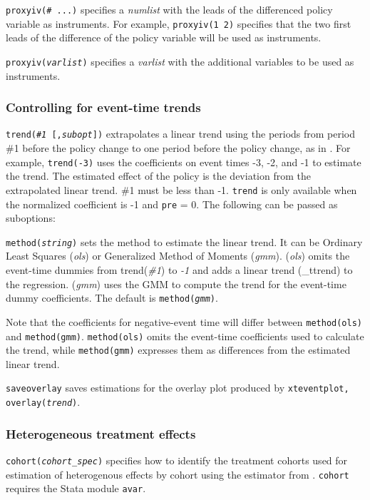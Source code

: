 \documentclass[12pt]{article}
\begin{document}
\morehangpara
{\tt proxyiv(\# ...)} specifies a \textit{numlist} with the leads of the differenced policy variable as instruments. For example, {\tt proxyiv(1 2)} specifies that the two first leads of the difference of the policy variable will be used as instruments.

\morehangpara
{\tt proxyiv({\it varlist})} specifies a \textit{varlist} with the additional variables to be used as instruments.

\subsubsection{Controlling for event-time trends}

\hangpara
{\tt trend({\it \#1} [,{\it subopt}])} extrapolates a linear trend using the periods from period \#1 before the policy change to one period before the policy change, as in \citet{dobkin2018economic}.
For example, {\tt trend(-3)} uses the coefficients on event times -3, -2, and -1 to estimate the trend.
The estimated effect of the policy is the deviation from the extrapolated linear trend.
\#1 must be less than  -1.
{\tt trend} is only available when the normalized coefficient is -1 and {\tt pre} = 0.
The following can be passed as suboptions:

\morehangpara
{\tt method({\it string})} sets the method to estimate the linear trend.
It can be Ordinary Least Squares ({\it ols}) or Generalized Method of Moments ({\it gmm}).
({\it ols}) omits the event-time dummies from trend({\it \#1}) to {\it -1} and adds a linear trend (\_ttrend) to the regression.
({\it gmm}) uses the GMM to compute the trend for the event-time dummy coefficients.
The default is {\tt method({\it gmm})}.

\morehangpara
Note that the coefficients for negative-event time will differ between {\tt method(ols)} and {\tt method(gmm)}.
{\tt method(ols)} omits the event-time coefficients used to calculate the trend, while {\tt method(gmm)} expresses them as differences from the estimated linear trend.

\morehangpara
{\tt saveoverlay} saves estimations for the overlay plot produced by {\tt xteventplot, overlay({\it trend})}.

\subsubsection{Heterogeneous treatment effects \citep{sun2021estimating}}

\hangpara
{\tt cohort({\it cohort\_spec})} specifies how to identify the treatment cohorts used for estimation of heterogenous effects by cohort using the estimator from \cite{sun2021estimating}.
{\tt cohort} requires the Stata module {\tt avar}.
\end{document}
